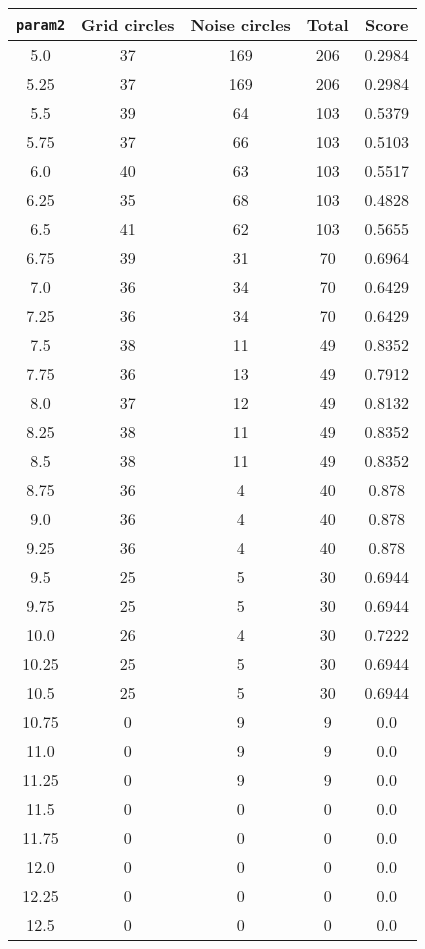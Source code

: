 \documentclass[letterpaper, 12pt]{article}
\begin{document}
\begin{longtable}{|c|c|c|c|c|}
\hline
\textbf{\texttt{param2}} & \textbf{Grid circles} & \textbf{Noise circles} & \textbf{Total} & \textbf{Score} \\
\hline
5.0 & 37 & 169 & 206 & 0.2984 \\
\hline
5.25 & 37 & 169 & 206 & 0.2984 \\
\hline
5.5 & 39 & 64 & 103 & 0.5379 \\
\hline
5.75 & 37 & 66 & 103 & 0.5103 \\
\hline
6.0 & 40 & 63 & 103 & 0.5517 \\
\hline
6.25 & 35 & 68 & 103 & 0.4828 \\
\hline
6.5 & 41 & 62 & 103 & 0.5655 \\
\hline
6.75 & 39 & 31 & 70 & 0.6964 \\
\hline
7.0 & 36 & 34 & 70 & 0.6429 \\
\hline
7.25 & 36 & 34 & 70 & 0.6429 \\
\hline
7.5 & 38 & 11 & 49 & 0.8352 \\
\hline
7.75 & 36 & 13 & 49 & 0.7912 \\
\hline
8.0 & 37 & 12 & 49 & 0.8132 \\
\hline
8.25 & 38 & 11 & 49 & 0.8352 \\
\hline
8.5 & 38 & 11 & 49 & 0.8352 \\
\hline
8.75 & 36 & 4 & 40 & 0.878 \\
\hline
9.0 & 36 & 4 & 40 & 0.878 \\
\hline
9.25 & 36 & 4 & 40 & 0.878 \\
\hline
9.5 & 25 & 5 & 30 & 0.6944 \\
\hline
9.75 & 25 & 5 & 30 & 0.6944 \\
\hline
10.0 & 26 & 4 & 30 & 0.7222 \\
\hline
10.25 & 25 & 5 & 30 & 0.6944 \\
\hline
10.5 & 25 & 5 & 30 & 0.6944 \\
\hline
10.75 & 0 & 9 & 9 & 0.0 \\
\hline
11.0 & 0 & 9 & 9 & 0.0 \\
\hline
11.25 & 0 & 9 & 9 & 0.0 \\
\hline
11.5 & 0 & 0 & 0 & 0.0 \\
\hline
11.75 & 0 & 0 & 0 & 0.0 \\
\hline
12.0 & 0 & 0 & 0 & 0.0 \\
\hline
12.25 & 0 & 0 & 0 & 0.0 \\
\hline
12.5 & 0 & 0 & 0 & 0.0 \\

\end{longtable}
\end{document}
